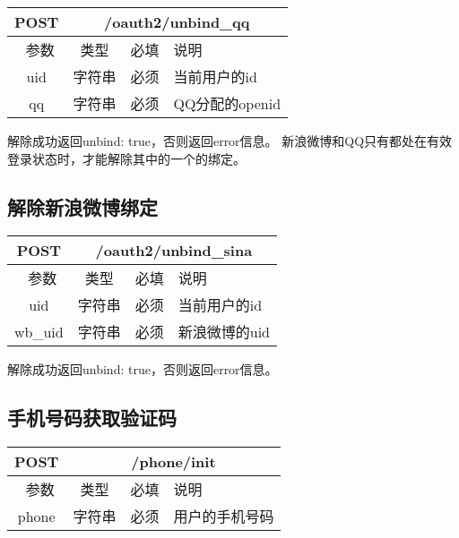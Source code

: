 \begin{table}[H]
   \begin{center}
\begin{tabular}{|c|c|c|p{12cm}|}
\hline
POST & \multicolumn{3}{|c|}{/oauth2/unbind\_qq} \\
\hline\hline
 \  参数  & 类型 & 必填 &  说明  \\
\hline
    uid  & 字符串 & 必须 &  当前用户的id\\
\hline
    qq  & 字符串 & 必须 &  QQ分配的openid\\    
\hline
\end{tabular}
   \end{center}
\end{table}
解除成功返回{unbind: true}，否则返回error信息。
新浪微博和QQ只有都处在有效登录状态时，才能解除其中的一个的绑定。


\subsection{解除新浪微博绑定}

\begin{table}[H]
   \begin{center}
\begin{tabular}{|c|c|c|p{12cm}|}
\hline
POST & \multicolumn{3}{|c|}{/oauth2/unbind\_sina} \\
\hline\hline
 \  参数  & 类型 & 必填 &  说明  \\
\hline
    uid  & 字符串 & 必须 &  当前用户的id\\
\hline
    wb\_uid  & 字符串 & 必须 &  新浪微博的uid\\    
\hline
\end{tabular}
   \end{center}
\end{table}
解除成功返回{unbind: true}，否则返回error信息。




\subsection{手机号码获取验证码}
\label{hash_algorithm}

\begin{table}[H]
   \begin{center}
\begin{tabular}{|c|c|c|p{12cm}|}
\hline
POST & \multicolumn{3}{|c|}{/phone/init} \\
\hline\hline
 \  参数  & 类型 & 必填 &  说明  \\
\hline
 phone  & 字符串 & 必须 &  用户的手机号码\\
\hline
\end{tabular}
   \end{center}
\end{table}

